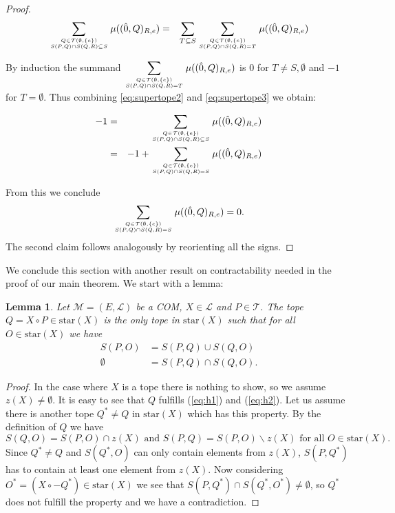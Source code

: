 \documentclass[12pt]{amsart}
\def\Tscr{{\mathcal T}}
\def\M{{\mathcal M}}
\def\cstar{{\mathrm{star}}}
\theoremstyle{plain}
\newtheorem{Lemma}{Lemma}
\numberwithin{Lemma}{\DefaultNumberTheoremWithin}
\numberwithin{Claim}{\DefaultNumberTheoremWithin}
\numberwithin{Theorem}{\DefaultNumberTheoremWithin}
\numberwithin{Corollary}{\DefaultNumberTheoremWithin}
\numberwithin{Proposition}{\DefaultNumberTheoremWithin}
\numberwithin{Conjecture}{\DefaultNumberTheoremWithin}
\numberwithin{Situation}{\DefaultNumberTheoremWithin}
\numberwithin{Note}{\DefaultNumberTheoremWithin}
\theoremstyle{definition}
\numberwithin{Definition}{\DefaultNumberTheoremWithin}
\theoremstyle{definition}
\numberwithin{Question}{\DefaultNumberTheoremWithin}
\theoremstyle{definition}
\numberwithin{Problem}{\DefaultNumberTheoremWithin}
\theoremstyle{remark} \newtheorem{Remark}{Remark}
\numberwithin{Remark}{\DefaultNumberTheoremWithin}
\theoremstyle{remark}
\numberwithin{Example}{\DefaultNumberTheoremWithin}
\numberwithin{Case}{Lemma}
\numberwithin{Step}{Lemma}
\begin{document}
\begin{proof}
  \begin{eqnarray} 
     \label{eq:supertope3}
     \sum_{\genfrac{}{}{0pt}{}{Q \in \Tscr(\emptyset,\{e\})}{ S(P,Q) \cap S(Q,R) \subseteq S}}  \mu((\hat{0},Q)_{R,e}) & = & \sum_{T \subseteq S} \sum_{\genfrac{}{}{0pt}{}{Q \in \Tscr(\emptyset,\{e\})}{ S(P,Q) \cap S(Q,R) = T}}  \mu((\hat{0},Q)_{R,e}) 
  \end{eqnarray}

  By induction the summand 
  $\displaystyle{\sum_{\genfrac{}{}{0pt}{}{Q \in \Tscr(\emptyset,\{e\})}{ S(P,Q) \cap S(Q,R) = T}}  \mu((\hat{0},Q)_{R,e})}$ 
  is $0$ for $T \neq S,\emptyset$ and $-1$ for $T = \emptyset$.
  Thus combining \eqref{eq:supertope2} and \eqref{eq:supertope3} we obtain:

  \begin{eqnarray*} 
     \label{eq:supertope4}
     -1 & = & \sum_{\genfrac{}{}{0pt}{}{Q \in \Tscr(\emptyset,\{e\})}{ S(P,Q) \cap S(Q,R) \subseteq S}}  \mu((\hat{0},Q)_{R,e}) \\
        & = & -1+\sum_{\genfrac{}{}{0pt}{}{Q \in \Tscr(\emptyset,\{e\})}{ S(P,Q) \cap S(Q,R) = S}}  \mu((\hat{0},Q)_{R,e}) 
  \end{eqnarray*}

  From this we conclude $$\sum_{\genfrac{}{}{0pt}{}{Q \in
      \Tscr(\emptyset,\{e\})}{ S(P,Q) \cap S(Q,R) = S}}
  \mu((\hat{0},Q)_{R,e}) = 0.$$ The second claim follows analogously
  by reorienting all the signs.
\end{proof}


We conclude this section with another result on contractability needed in the proof of our main theorem. We start with a lemma:

\begin{Lemma}\label{gateCOM} Let $\M=(E,\mathcal{L})$ be a COM, $X \in \mathcal{L}$ and $P \in \Tscr$. The tope $Q = X \circ P \in \cstar(X)$ is the only tope in $\cstar(X)$ such that for all $O \in \cstar(X)$ we have
  \begin{align}
   S(P,O) & =  S(P,Q) \cup S(Q,O) \label{eq:h1} \\  
    \emptyset & =   S(P,Q) \cap S(Q,O). \label{eq:h2}
  \end{align}
\end{Lemma}
\begin{proof}
 In the case where $X$ is a tope there is nothing to show, so we assume $z(X) \neq \emptyset$. It is easy to see that $Q$ fulfills (\ref{eq:h1}) and (\ref{eq:h2}).
  Let us assume there is another tope $Q^* \neq Q$ in $\cstar(X)$
  which has this property. By the definition of $Q$ we have
  \[S(Q,O)=S(P,O) \cap z(X)\text{ and }S(P,Q)=S(P,O) \backslash z(X)\text{ for all }O \in \cstar(X).\] 
  Since $Q^* \neq Q$ and $S(Q^*,O)$
  can only contain elements from $z(X)$, $S(P,Q^*)$ has to contain at least
  one element from $z(X)$. Now considering $O^* = (X \circ -Q^*) \in
  \cstar(X)$ we see that $S(P,Q^*) \cap S(Q^*,O^*) \neq \emptyset$, so
  $Q^*$ does not fulfill the property and we have a contradiction.
\end{proof}
\end{document}
